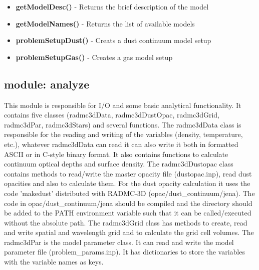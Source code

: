 \documentclass[12pt]{article}
\begin{document}
\begin{itemize}
\item[] {\bf getModelDesc()} - Returns the brief description of the model
\item[] {\bf getModelNames()} - Returns the list of available models
\item[] {\bf problemSetupDust()} - Creats a dust continuum model setup
\item[] {\bf problemSetupGas()} - Creates a gas model setup
\end{itemize}

\subsection{module: analyze}
\label{subsec:analyze}

This module is responsible for I/O and some basic analytical functionality. It contains five classes 
(radmc3dData, radmc3dDustOpac, radmc3dGrid, radmc3dPar, radmc3dStars) and several functions. 
The radmc3dData class is responsible for the reading and writing of the variables (density, temperature, 
etc.), whatever radmc3dData can read it can also write it both in formatted ASCII or in C-style binary format. 
It also contains functions to calculate continuum optical depths and surface density. The radmc3dDustopac class
contains methods to  read/write the master opacity file (dustopac.inp), read dust opacities and also to calculate
them. For the dust opacity calculation it uses the code 'makedust' distributed with RADMC-3D (opac/dust\_continuum/jena). 
The code in opac/dust\_continuum/jena should be compiled and the directory should be added to the PATH environment
variable such that it can be called/executed without the absolute path. The radmc3dGrid class has methods to create, read and 
write spatial and wavelength grid and to calculate the grid cell volumes. The radmc3dPar is the model parameter class. 
It can read and write the  model parameter file (problem\_params.inp). It has dictionaries to store the variables with the
variable names as keys. 
\end{document}
